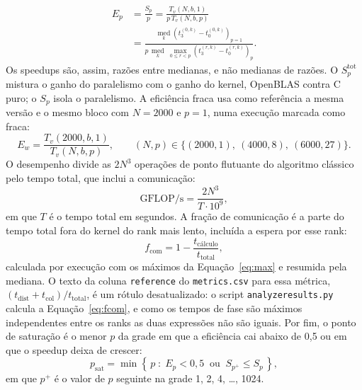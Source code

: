 \documentclass[Portugues]{ic-tese-v3}
\DeclareRobustCommand{\_}{\textunderscore\allowbreak} %
\begin{document}
\begin{equation}\label{eq:ep}
\begin{split}
E_p &= \frac{S_p}{p} = \frac{T_v(N,b,1)}{p \, T_v(N,b,p)} \\[4pt]
&= \frac{\operatorname*{med}_{k} \left( t_3^{(0,k)} - t_0^{(0,k)} \right)_{p=1}}
        {p \, \operatorname*{med}_{k} \; \max_{0 \le r < p} \left( t_3^{(r,k)} - t_0^{(r,k)} \right)_{p}}.
\end{split}
\end{equation}
Os speedups são, assim, razões entre medianas, e não medianas de razões.
O $S^{\mathrm{tot}}_p$ mistura o ganho do paralelismo com o ganho do kernel, OpenBLAS contra C puro; o $S_p$ isola o paralelismo. A eficiência fraca usa como referência a mesma versão e o mesmo bloco com $N=2000$ e $p=1$, numa execução marcada como fraca:
\begin{equation}\label{eq:ew}
E_w = \frac{T_v(2000,b,1)}{T_v(N,b,p)}, \qquad (N,p) \in \{(2000,1),\ (4000,8),\ (6000,27)\}.
\end{equation}
O desempenho divide as $2N^3$ operações de ponto flutuante do algoritmo clássico pelo tempo total, que inclui a comunicação:
\begin{equation}\label{eq:gflops}
\mathrm{GFLOP/s} = \frac{2N^3}{T \cdot 10^{9}},
\end{equation}
em que $T$ é o tempo total em segundos. A fração de comunicação é a parte do tempo total fora do kernel do rank mais lento, incluída a espera por esse rank:
\begin{equation}\label{eq:fcom}
f_{\mathrm{com}} = 1 - \frac{t_{\textrm{cálculo}}}{t_{\mathrm{total}}},
\end{equation}
calculada por execução com os máximos da Equação~\eqref{eq:max} e resumida pela mediana. O texto da coluna \texttt{reference} do \texttt{metrics.csv} para essa métrica, $(t_{\mathrm{dist}} + t_{\mathrm{col}})/t_{\mathrm{total}}$, é um rótulo desatualizado: o script \texttt{analyze\_results.py} calcula a Equação~\eqref{eq:fcom}, e como os tempos de fase são máximos independentes entre os ranks as duas expressões não são iguais. Por fim, o ponto de saturação é o menor $p$ da grade em que a eficiência cai abaixo de 0,5 ou em que o speedup deixa de crescer:
\begin{equation}\label{eq:sat}
p_{\mathrm{sat}} = \min \left\{\, p \;:\; E_p < 0{,}5 \ \text{ ou } \ S_{p^{+}} \le S_p \,\right\},
\end{equation}
em que $p^{+}$ é o valor de $p$ seguinte na grade 1, 2, 4, \dots, 1024.
\end{document}
